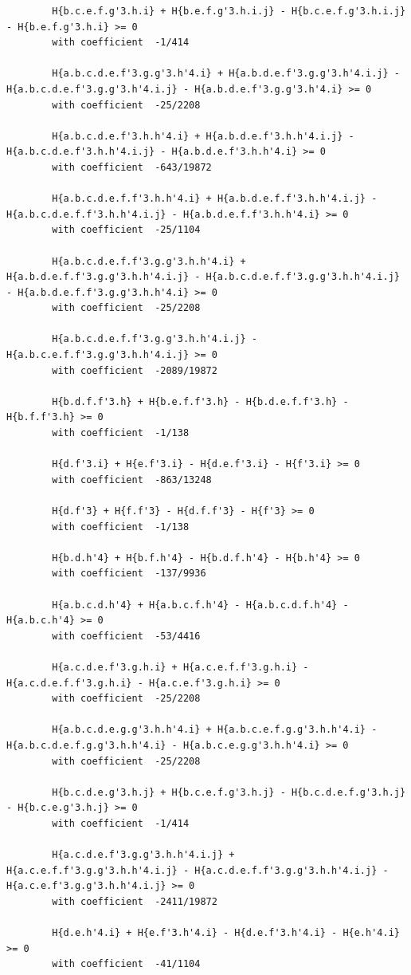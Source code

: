 \documentclass[11pt, a4paper]{kybernetika}
\begin{document}
\begin{verbatim}
		H{b.c.e.f.g'3.h.i} + H{b.e.f.g'3.h.i.j} - H{b.c.e.f.g'3.h.i.j} - H{b.e.f.g'3.h.i} >= 0
		with coefficient  -1/414
		
		H{a.b.c.d.e.f'3.g.g'3.h'4.i} + H{a.b.d.e.f'3.g.g'3.h'4.i.j} - H{a.b.c.d.e.f'3.g.g'3.h'4.i.j} - H{a.b.d.e.f'3.g.g'3.h'4.i} >= 0
		with coefficient  -25/2208
		
		H{a.b.c.d.e.f'3.h.h'4.i} + H{a.b.d.e.f'3.h.h'4.i.j} - H{a.b.c.d.e.f'3.h.h'4.i.j} - H{a.b.d.e.f'3.h.h'4.i} >= 0
		with coefficient  -643/19872
		
		H{a.b.c.d.e.f.f'3.h.h'4.i} + H{a.b.d.e.f.f'3.h.h'4.i.j} - H{a.b.c.d.e.f.f'3.h.h'4.i.j} - H{a.b.d.e.f.f'3.h.h'4.i} >= 0
		with coefficient  -25/1104
		
		H{a.b.c.d.e.f.f'3.g.g'3.h.h'4.i} + H{a.b.d.e.f.f'3.g.g'3.h.h'4.i.j} - H{a.b.c.d.e.f.f'3.g.g'3.h.h'4.i.j} - H{a.b.d.e.f.f'3.g.g'3.h.h'4.i} >= 0
		with coefficient  -25/2208
		
		H{a.b.c.d.e.f.f'3.g.g'3.h.h'4.i.j} - H{a.b.c.e.f.f'3.g.g'3.h.h'4.i.j} >= 0
		with coefficient  -2089/19872
		
		H{b.d.f.f'3.h} + H{b.e.f.f'3.h} - H{b.d.e.f.f'3.h} - H{b.f.f'3.h} >= 0
		with coefficient  -1/138
		
		H{d.f'3.i} + H{e.f'3.i} - H{d.e.f'3.i} - H{f'3.i} >= 0
		with coefficient  -863/13248
		
		H{d.f'3} + H{f.f'3} - H{d.f.f'3} - H{f'3} >= 0
		with coefficient  -1/138
		
		H{b.d.h'4} + H{b.f.h'4} - H{b.d.f.h'4} - H{b.h'4} >= 0
		with coefficient  -137/9936
		
		H{a.b.c.d.h'4} + H{a.b.c.f.h'4} - H{a.b.c.d.f.h'4} - H{a.b.c.h'4} >= 0
		with coefficient  -53/4416
		
		H{a.c.d.e.f'3.g.h.i} + H{a.c.e.f.f'3.g.h.i} - H{a.c.d.e.f.f'3.g.h.i} - H{a.c.e.f'3.g.h.i} >= 0
		with coefficient  -25/2208
		
		H{a.b.c.d.e.g.g'3.h.h'4.i} + H{a.b.c.e.f.g.g'3.h.h'4.i} - H{a.b.c.d.e.f.g.g'3.h.h'4.i} - H{a.b.c.e.g.g'3.h.h'4.i} >= 0
		with coefficient  -25/2208
		
		H{b.c.d.e.g'3.h.j} + H{b.c.e.f.g'3.h.j} - H{b.c.d.e.f.g'3.h.j} - H{b.c.e.g'3.h.j} >= 0
		with coefficient  -1/414
		
		H{a.c.d.e.f'3.g.g'3.h.h'4.i.j} + H{a.c.e.f.f'3.g.g'3.h.h'4.i.j} - H{a.c.d.e.f.f'3.g.g'3.h.h'4.i.j} - H{a.c.e.f'3.g.g'3.h.h'4.i.j} >= 0
		with coefficient  -2411/19872
		
		H{d.e.h'4.i} + H{e.f'3.h'4.i} - H{d.e.f'3.h'4.i} - H{e.h'4.i} >= 0
		with coefficient  -41/1104
		

\end{verbatim}
\end{document}
